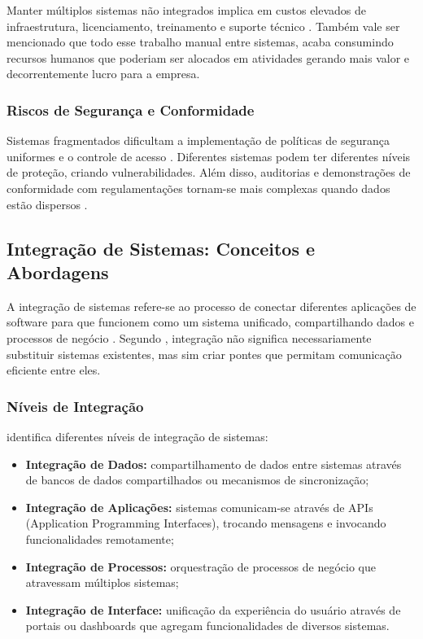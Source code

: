 Manter múltiplos sistemas não integrados implica em custos elevados de infraestrutura, licenciamento, treinamento e suporte técnico \cite{turban2010}. Também vale ser mencionado que todo esse trabalho manual entre sistemas, acaba consumindo recursos humanos que poderiam ser alocados em atividades gerando mais valor e decorrentemente lucro para a empresa.
\subsubsection{Riscos de Segurança e Conformidade}
Sistemas fragmentados dificultam a implementação de políticas de segurança uniformes e o controle de acesso \cite{whitman2018}. Diferentes sistemas podem ter diferentes níveis de proteção, criando vulnerabilidades. Além disso, auditorias e demonstrações de conformidade com regulamentações tornam-se mais complexas quando dados estão dispersos \cite{siponen2010}.
\subsection{Integração de Sistemas: Conceitos e Abordagens}
A integração de sistemas refere-se ao processo de conectar diferentes aplicações de software para que funcionem como um sistema unificado, compartilhando dados e processos de negócio \cite{hohpe2003}. Segundo \cite{linthicum2000}, integração não significa necessariamente substituir sistemas existentes, mas sim criar pontes que permitam comunicação eficiente entre eles.

\subsubsection{Níveis de Integração}

\cite{ruh2000} identifica diferentes níveis de integração de sistemas:

\begin{itemize}
    \item \textbf{Integração de Dados:} compartilhamento de dados entre sistemas através de bancos de dados compartilhados ou mecanismos de sincronização;
    \item \textbf{Integração de Aplicações:} sistemas comunicam-se através de APIs (Application Programming Interfaces), trocando mensagens e invocando funcionalidades remotamente;
    \item \textbf{Integração de Processos:} orquestração de processos de negócio que atravessam múltiplos sistemas;
    \item \textbf{Integração de Interface:} unificação da experiência do usuário através de portais ou dashboards que agregam funcionalidades de diversos sistemas.
\end{itemize}

